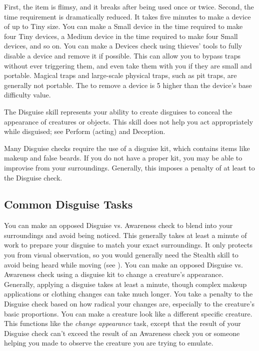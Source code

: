         First, the item is flimsy, and it breaks after being used once or twice.
        Second, the time requirement is dramatically reduced.
        It takes five minutes to make a device of up to Tiny size.
        You can make a Small device in the time required to make four Tiny devices, a Medium device in the time required to make four Small devices, and so on.
         You can make a Devices check using thieves' tools to fully disable a device and remove it if possible.
        This can allow you to bypass traps without ever triggering them, and even take them with you if they are small and portable.
        Magical traps and large-scale physical traps, such as pit traps, are generally not portable.
        The  to remove a device is 5 higher than the device's base difficulty value.

\newpage
{}
    The Disguise skill represents your ability to create disguises to conceal the appearance of creatures or objects.
    This skill does not help you act appropriately while disguised; see Perform (acting) and Deception.

    Many Disguise checks require the use of a disguise kit, which contains items like makeup and false beards.
    If you do not have a proper kit, you may be able to improvise from your surroundings.
    Generally, this imposes a penalty of at least  to the Disguise check.

    \subsection{Common Disguise Tasks}
         You can make an opposed Disguise vs. Awareness check to blend into your surroundings and avoid being noticed.
        This generally takes at least a minute of work to prepare your disguise to match your exact surroundings.
        It only protects you from visual observation, so you would generally need the Stealth skill to avoid being heard while moving (see ).
        \label{Change Appearance} 
        You can make an opposed Disguise vs. Awareness check using a disguise kit to change a creature's appearance.
        Generally, applying a disguise takes at least a minute, though complex makeup applications or clothing changes can take much longer.
        You take a penalty to the Disguise check based on how radical your changes are, especially to the creature's basic proportions.
         You can make a creature look like a different specific creature.
         This functions like the \textit{change appearance} task, except that the result of your Disguise check can't exceed the result of an Awareness check you or someone helping you made to observe the creature you are trying to emulate.

